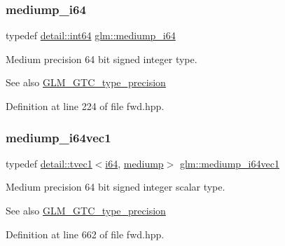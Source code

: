 \subsubsection{\texorpdfstring{mediump\+\_\+i64}{mediump\_i64}}
{\footnotesize\ttfamily typedef \hyperlink{namespaceglm_1_1detail_a5b1c3227ec636c24a0676746381adfc8}{detail\+::int64} \hyperlink{group__gtc__type__precision_ga90fedf6c701ffbe00535156715e50787}{glm\+::mediump\+\_\+i64}}

Medium precision 64 bit signed integer type. \begin{DoxySeeAlso}{See also}
\hyperlink{group__gtc__type__precision}{G\+L\+M\+\_\+\+G\+T\+C\+\_\+type\+\_\+precision} 
\end{DoxySeeAlso}


Definition at line 224 of file fwd.\+hpp.

\mbox{\label{group__gtc__type__precision_gad2423a91c791b9ca2f8a3ecfc71b080d}} 
\subsubsection{\texorpdfstring{mediump\+\_\+i64vec1}{mediump\_i64vec1}}
{\footnotesize\ttfamily typedef \hyperlink{structglm_1_1detail_1_1tvec1}{detail\+::tvec1}$<$\hyperlink{group__gtc__type__precision_gac7a7eaad46064fc952b06df33689da23}{i64}, \hyperlink{namespaceglm_a0f04f086094c747d227af4425893f545a6416f3ea0c9025fb21ed50c4d6620482}{mediump}$>$ \hyperlink{group__gtc__type__precision_gad2423a91c791b9ca2f8a3ecfc71b080d}{glm\+::mediump\+\_\+i64vec1}}

Medium precision 64 bit signed integer scalar type. \begin{DoxySeeAlso}{See also}
\hyperlink{group__gtc__type__precision}{G\+L\+M\+\_\+\+G\+T\+C\+\_\+type\+\_\+precision} 
\end{DoxySeeAlso}


Definition at line 662 of file fwd.\+hpp.

\mbox{\label{group__gtc__type__precision_ga5cf0bec13b01b6124e966360cffe15a4}} 
